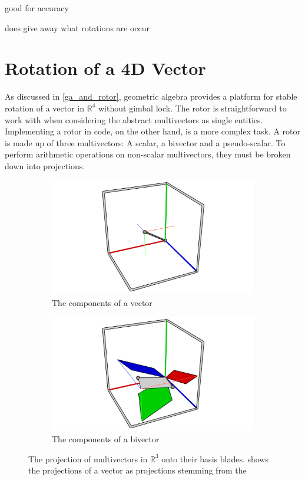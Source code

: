 \documentclass{l4proj}
\begin{document}
good for accuracy

does give away what rotations are occur

\pagebreak

\section{Rotation of a 4D Vector}

As discussed in \cref{ga_and_rotor}, geometric algebra provides a platform for stable rotation of a vector in $\mathbb{R}^4$ without gimbal lock. 
The rotor is straightforward to work with when considering the abstract multivectors as single entities. Implementing a rotor in code, on the other hand, is a more complex task. 
A rotor is made up of three multivectors: A scalar, a bivector and a pseudo-scalar. To perform arithmetic operations on non-scalar multivectors, they must be broken down into projections. 

\begin{figure}
  \begin{subfigure}[b]{0.45\textwidth}
    \includegraphics[width=\textwidth]{images/rotation/projection_vec.png}
    \caption{The components of a vector}
    \label{fig:vec_proj}
  \end{subfigure}
  \begin{subfigure}[b]{0.45\textwidth}
    \includegraphics[width=\textwidth]{images/rotation/projection_biv.png}
    \caption{The components of a bivector}
    \label{fig:bivec_proj}
  \end{subfigure}
  \caption{The projection of multivectors in $\mathbb{R}^3$ onto their basis blades.  shows the projections of a vector as projections stemming from the }
  \label{fig:projections}
\end{figure}
\end{document}
